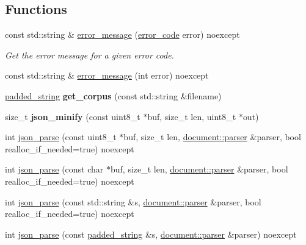 \subsection*{Functions}
\begin{DoxyCompactItemize}
\item 
const std\+::string \& \hyperlink{namespacesimdjson_a4872e460818b01f93d883d184cd0009e}{error\+\_\+message} (\hyperlink{namespacesimdjson_a7b735a3a50ba79e3f7f14df5f77d8da9}{error\+\_\+code} error) noexcept
\begin{DoxyCompactList}\small\item\em Get the error message for a given error code. \end{DoxyCompactList}\item 
const std\+::string \& \hyperlink{namespacesimdjson_a764fbe7ff17a26fd55bf10dcb5b925c8}{error\+\_\+message} (int error) noexcept
\item 
\mbox{\label{namespacesimdjson_a422ccfb6c4e71081c2184087a2251deb}} 
\hyperlink{structsimdjson_1_1padded__string}{padded\+\_\+string} {\bfseries get\+\_\+corpus} (const std\+::string \&filename)
\item 
\mbox{\label{namespacesimdjson_a5243584cec695fd994c1c72edd1ab40d}} 
size\+\_\+t {\bfseries json\+\_\+minify} (const uint8\+\_\+t $\ast$buf, size\+\_\+t len, uint8\+\_\+t $\ast$out)
\item 
int \hyperlink{namespacesimdjson_abda111a8c160cd422c8e5e6d2542f1eb}{json\+\_\+parse} (const uint8\+\_\+t $\ast$buf, size\+\_\+t len, \hyperlink{classsimdjson_1_1document_1_1parser}{document\+::parser} \&parser, bool realloc\+\_\+if\+\_\+needed=true) noexcept
\item 
int \hyperlink{namespacesimdjson_aaf12ce2bb0a7873455998e5bd8a2f207}{json\+\_\+parse} (const char $\ast$buf, size\+\_\+t len, \hyperlink{classsimdjson_1_1document_1_1parser}{document\+::parser} \&parser, bool realloc\+\_\+if\+\_\+needed=true) noexcept
\item 
int \hyperlink{namespacesimdjson_a318618417b19957567c953ffe43532cb}{json\+\_\+parse} (const std\+::string \&s, \hyperlink{classsimdjson_1_1document_1_1parser}{document\+::parser} \&parser, bool realloc\+\_\+if\+\_\+needed=true) noexcept
\item 
int \hyperlink{namespacesimdjson_aae2715d0a12bd296b6e743c0cb346e15}{json\+\_\+parse} (const \hyperlink{structsimdjson_1_1padded__string}{padded\+\_\+string} \&s, \hyperlink{classsimdjson_1_1document_1_1parser}{document\+::parser} \&parser) noexcept

\end{DoxyCompactItemize}
